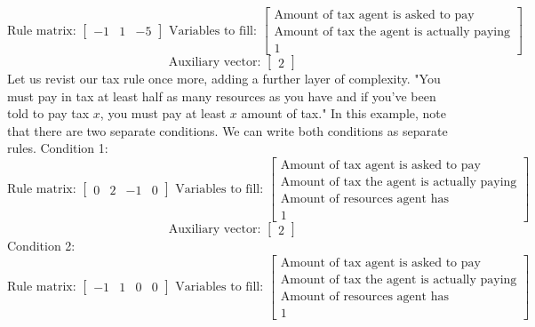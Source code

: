 \[
    \textrm{Rule matrix: }
    \begin{bmatrix}
        -1 & 1 & -5
    \end{bmatrix}
    \textrm{   Variables to fill:  }
    \begin{bmatrix}
        \textrm{Amount of tax agent is asked to pay} \\
        \textrm{Amount of tax the agent is actually paying} \\
        1
    \end{bmatrix}     
\]
\[
    \textrm{   Auxiliary vector: } 
    \begin{bmatrix}
        2 
    \end{bmatrix}   
\]
Let us revist our tax rule once more, adding a further layer of complexity.
\linebreak
\linebreak
"You must pay in tax at least half as many resources as you have and if you've been told to pay tax $x$, you must pay at least $x$ amount of tax."
In this example, note that there are two separate conditions. We can write both conditions as separate rules.
Condition 1:
\[
    \textrm{Rule matrix: }
    \begin{bmatrix}
        0 & 2 & -1 & 0
    \end{bmatrix}
    \textrm{   Variables to fill:  }
    \begin{bmatrix}
        \textrm{Amount of tax agent is asked to pay} \\
        \textrm{Amount of tax the agent is actually paying} \\
        \textrm{Amount of resources agent has} \\
        1
    \end{bmatrix}     
\]
\[
    \textrm{   Auxiliary vector: } 
    \begin{bmatrix}
        2 
    \end{bmatrix}   
\]
\linebreak
Condition 2:
\[
    \textrm{Rule matrix: }
    \begin{bmatrix}
        -1 & 1 & 0 & 0
    \end{bmatrix}
    \textrm{   Variables to fill:  }
    \begin{bmatrix}
        \textrm{Amount of tax agent is asked to pay} \\
        \textrm{Amount of tax the agent is actually paying} \\
        \textrm{Amount of resources agent has} \\
        1
    \end{bmatrix}     
\]
